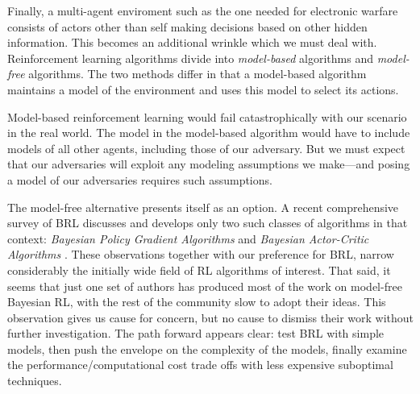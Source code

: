 \documentclass{article}
\begin{document}
Finally, a multi-agent enviroment such as the one needed for
electronic warfare consists of actors other than self making decisions
based on other hidden information.  This becomes an additional wrinkle
which we must deal with.  Reinforcement learning algorithms divide
into \emph{model-based} algorithms and \emph{model-free} algorithms.
The two methods differ in that a model-based algorithm maintains a
model of the environment and uses this model to select its actions.

Model-based reinforcement learning would fail catastrophically with
our scenario in the real world.  The model in the model-based
algorithm would have to include models of all other agents, including
those of our adversary.  But we must expect that our adversaries will
exploit any modeling assumptions we make---and posing a model of our
adversaries requires such assumptions.

The model-free alternative presents itself as an option.  A recent
comprehensive survey of BRL \cite{ghavamzadeh2016bayesian} discusses
and develops only two such classes of algorithms in that context:
\emph{Bayesian Policy Gradient Algorithms} \cite{engel2007bayesian,
  ghavamzadeh2016abayesian} and \emph{Bayesian Actor-Critic
  Algorithms} \cite{ghavamzadeh2007bayesian,
  ghavamzadeh2016abayesian}.  These observations together with our
preference for BRL, narrow considerably the initially wide field of RL
algorithms of interest.  That said, it seems that just one set of
authors has produced most of the work on model-free Bayesian RL, with
the rest of the community slow to adopt their ideas.  This observation
gives us cause for concern, but no cause to dismiss their work without
further investigation.  The path forward appears clear: test BRL with
simple models, then push the envelope on the complexity of the models,
finally examine the performance/computational cost trade offs with
less expensive suboptimal techniques.


% 

\end{document}
